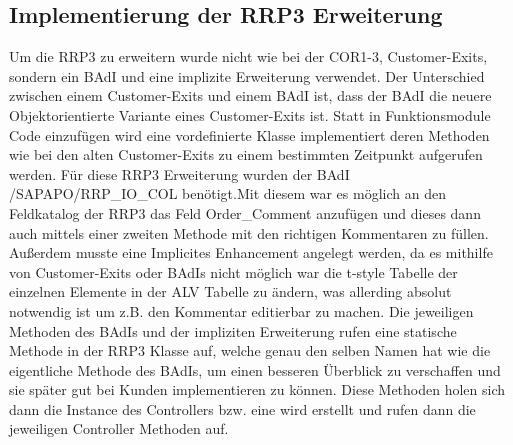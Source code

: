 \subsection{Implementierung der RRP3 Erweiterung}
\label{sec:Implementierung der RRP3 Erweiterung}   
Um die RRP3 zu erweitern wurde nicht wie bei der COR1-3, Customer-Exits, sondern ein \ac{BAdI} und eine implizite Erweiterung verwendet. Der Unterschied zwischen einem Customer-Exits und einem \ac{BAdI} ist, dass der \ac{BAdI} die neuere Objektorientierte Variante eines Customer-Exits ist. Statt in Funktionsmodule Code einzufügen wird eine vordefinierte Klasse implementiert deren Methoden wie bei den alten Customer-Exits zu einem bestimmten Zeitpunkt aufgerufen werden. Für diese RRP3 Erweiterung wurden der \ac{BAdI} /SAPAPO/RRP\_IO\_COL benötigt.Mit diesem war es möglich an den Feldkatalog der RRP3 das Feld Order\_Comment anzufügen und dieses dann auch mittels einer zweiten Methode mit den richtigen Kommentaren zu füllen. Außerdem musste eine Implicites Enhancement angelegt werden, da es mithilfe von Customer-Exits oder \ac{BAdI}s nicht möglich war die t-style Tabelle der einzelnen Elemente in der \ac{ALV} Tabelle zu ändern, was allerding absolut notwendig ist um z.B. den Kommentar editierbar zu machen. Die jeweiligen Methoden des \ac{BAdI}s und der impliziten Erweiterung rufen eine statische Methode in der RRP3 Klasse auf, welche genau den selben Namen hat wie die eigentliche Methode des \ac{BAdI}s, um einen besseren Überblick zu verschaffen und sie später gut bei Kunden implementieren zu können. Diese Methoden holen sich dann die Instance des Controllers bzw. eine wird erstellt und rufen dann die jeweiligen Controller Methoden auf.

